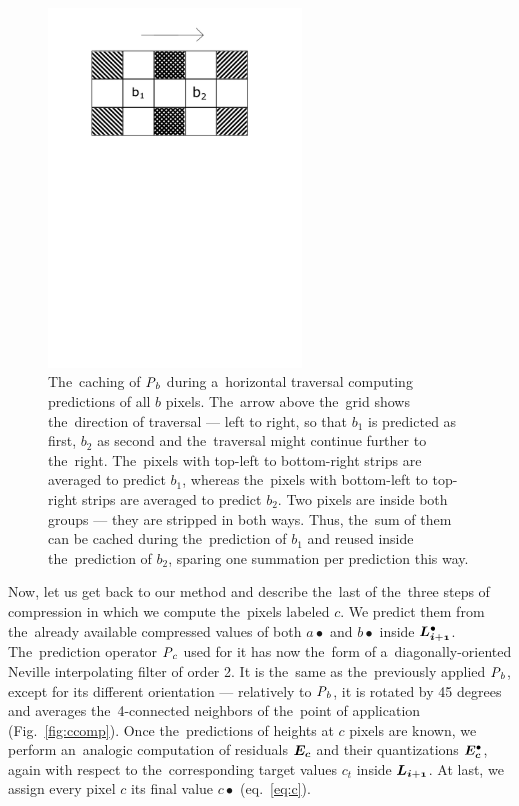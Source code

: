 \begin{figure}
	\includegraphics[trim={0 19cm 0cm 1cm}, clip, width=0.6\textwidth]{figures/bcaching.pdf}\centering
	\caption{The~caching of $\mathit{P_{b}}$ during a~horizontal traversal computing predictions of all $b$ pixels. The~arrow above the~grid shows the~direction of traversal --- left to right, so that $b_1$ is predicted as first, $b_2$ as second and the~traversal might continue further to the~right. The~pixels with top-left to bottom-right strips are averaged to predict $b_1$, whereas the~pixels with bottom-left to top-right strips are averaged to predict $b_2$. Two pixels are inside both groups --- they are stripped in both ways. Thus, the~sum of them can be cached during the~prediction of $b_1$ and reused inside the~prediction of $b_2$, sparing one summation per prediction this way.}
	\label{fig:bcaching}
\end{figure}

Now, let us get back to our method and describe the~last of the~three steps of compression in which we compute the~pixels labeled $c$. We predict them from the~already available compressed values of both $a\bullet$ and $b\bullet$ inside $\ldot{i+1}$. The~prediction operator $\mathit{P_{c}}$ used for it has now the~form of a~diagonally-oriented Neville interpolating filter of order 2. It is the~same as the~previously applied $\mathit{P_{b}}$, except for its different orientation --- relatively to $\mathit{P_{b}}$, it is rotated by 45 degrees and averages the~4-connected neighbors of the~point of application (Fig.~\ref{fig:ccomp}). Once the~predictions of heights at $c$ pixels are known, we perform an~analogic computation of residuals $\objnorm{E}{c}$ and their quantizations $\objdot{E}{c}$, again with respect to the~corresponding target values $c_t$ inside $\lnorm{i+1}$. At last, we assign every pixel $c$ its final value $c\bullet$ (eq.~\ref{eq:c}).

